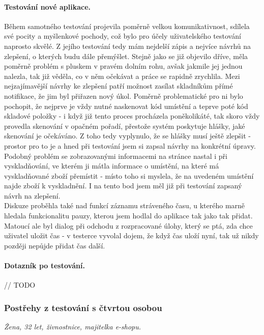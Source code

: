 \paragraph{Testování nové aplikace.} Během samotného testování projevila poměrně velkou komunikativnost, sdílela své pocity a myšlenkové pochody, což bylo pro účely uživatelského testování naprosto skvělé. Z jejího testování tedy mám nejdelší zápis a nejvíce návrhů na zlepšení, o kterých budu dále přemýšlet. Stejně jako se již objevilo dříve, měla poměrně problém s pluskem v pravém dolním rohu, avšak jakmile jej jednou nalezla, tak již věděla, co v něm očekávat a práce se rapidně zrychlila. Mezi nejzajímavější návrhy ke zlepšení patří možnost zasílat skladníkům přímé notifikace, že jim byl přiřazen nový úkol. Poměrně problematické pro ni bylo pochopit, že nejprve je vždy nutné naskenovat kód umístění a teprve poté kód skladové položky - i když již tento proces procházela poněkolikáté, tak skoro vždy provedla skenování v opačném pořadí, přestože systém poskytuje hlášky, jaké skenování je očekáváno. Z toho tedy vyplynulo, že se hlášky musí ještě zlepšit - prostor pro to je a hned při testování jsem si zapsal návrhy na konkrétní úpravy. Podobný problém se zobrazovanými informacemi na stránce nastal i při vyskladňování, ve kterém ji mátla informace o umístění, na které má vyskladňované zboží přemístit - místo toho si myslela, že na uvedeném umístění najde zboží k vyskladnění. I na tento bod jsem měl již při testování zapsaný návrh na zlepšení.\\
Diskuze proběhla také nad funkcí záznamu stráveného času, u kterého marně hledala funkcionalitu pauzy, kterou jsem hodlal do aplikace tak jako tak přidat. Matoucí ale byl dialog při odchodu z rozpracované úlohy, který se ptá, zda chce uživatel uložit čas - v testerce vyvolal dojem, že když čas uloží nyní, tak už nikdy později nepůjde přidat čas další. 

\paragraph{Dotazník po testování.} // TODO


\subsubsection{Postřehy z testování s čtvrtou osobou}
\emph{Žena, 32 let, živnostnice, majitelka e-shopu.}


